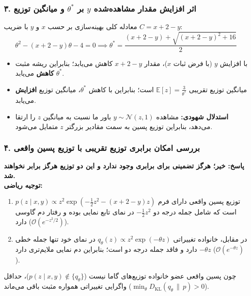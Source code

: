 \subsubsection{۳. اثر افزایش مقدار مشاهده‌شده $y$ بر $\theta^*$ و میانگین توزیع}
معادله کلی بهینه‌سازی بر حسب $x$ و $y$ با ضریب $C = x + 2 - y$:
\[
  \theta^2 - (x + 2 - y)\theta - 4 = 0 \implies \theta^* = \frac{(x + 2 - y) + \sqrt{(x + 2 - y)^2 + 16}}{2}
\]
\begin{itemize}
  \item با افزایش $y$ (با فرض ثبات $x$)، مقدار $x + 2 - y$ کاهش می‌یابد؛ بنابراین ریشه مثبت $\theta^*$ \textbf{کاهش} می‌یابد.
  \item میانگین توزیع تقریبی $\mathbb{E}[z] = \frac{3}{\theta^*}$ است؛ بنابراین با کاهش $\theta^*$، میانگین توزیع \textbf{افزایش} می‌یابد.
  \item \textbf{استدلال شهودی:} مشاهده $y \sim \mathcal{N}(z, 1)$ باور ما نسبت به میانگین $z$ را ارتقا می‌دهد، بنابراین توزیع پسین به سمت مقادیر بزرگتر $z$ متمایل می‌شود.
\end{itemize}

\subsubsection{۴. بررسی امکان برابری توزیع تقریبی با توزیع پسین واقعی}
\textbf{پاسخ: خیر؛ هرگز تضمینی برای برابری وجود ندارد و این دو توزیع هرگز برابر نخواهند شد.} \\
\textbf{توجیه ریاضی:}
\begin{enumerate}
  \item توزیع پسین واقعی دارای فرم $p(z \mid x, y) \propto z^2 \exp(-\frac{1}{2}z^2 - (x+2-y)z)$ است که شامل جمله درجه دو $-\frac{1}{2}z^2$ در نمای تابع نمایی بوده و رفتار دم گاوسی دارد ($\mathcal{O}(e^{-z^2/2})$).
  \item در مقابل، خانواده تغییراتی $q_\theta(z) \propto z^2 \exp(-\theta z)$ در نمای خود تنها جمله خطی $-\theta z$ دارد و فاقد جمله درجه دو است؛ بنابراین دم نمایی ملایم‌تری دارد ($\mathcal{O}(e^{-\theta z})$).
\end{enumerate}
چون پسین واقعی عضو خانواده توزیع‌های گاما نیست ($p(z \mid x, y) \notin \{q_\theta\}$)، حداقل واگرایی تغییراتی همواره مثبت باقی می‌ماند ($\min_\theta D_{\text{KL}}(q_\theta \,\|\, p) > 0$).
